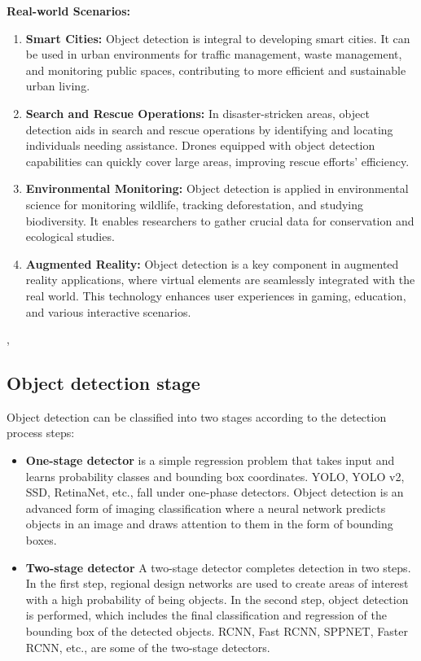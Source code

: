 \textbf{Real-world Scenarios:}\\
\begin{enumerate}
    \item \textbf{Smart Cities:} Object detection is integral to developing smart cities. It can be used in urban environments for traffic management, waste management, and monitoring public spaces, contributing to more efficient and sustainable urban living.
    \item \textbf{Search and Rescue Operations:} In disaster-stricken areas, object detection aids in search and rescue operations by identifying and locating individuals needing assistance. Drones equipped with object detection capabilities can quickly cover large areas, improving rescue efforts' efficiency.
    \item \textbf{Environmental Monitoring: } Object detection is applied in environmental science for monitoring wildlife, tracking deforestation, and studying biodiversity. It enables researchers to gather crucial data for conservation and ecological studies.
    \item \textbf{Augmented Reality:} Object detection is a key component in augmented reality applications, where virtual elements are seamlessly integrated with the real world. This technology enhances user experiences in gaming, education, and various interactive scenarios.
\end{enumerate} \cite{ansari2020building}, \cite{pathak2018application}

\subsection{Object detection stage}
Object detection can be classified into two stages according to the detection process steps:
\begin{itemize}
    \item \textbf{One-stage detector}  is a simple regression problem that takes input and learns probability classes and bounding box coordinates. YOLO, YOLO v2, SSD, RetinaNet, etc., fall under one-phase detectors. Object detection is an advanced form of imaging classification where a neural network predicts objects in an image and draws attention to them in the form of bounding boxes. \cite{oneStage}
    \item \textbf{Two-stage detector} A two-stage detector completes detection in two steps. In the first step, regional design networks are used to create areas of interest with a high probability of being objects. In the second step, object detection is performed, which includes the final classification and regression of the bounding box of the detected objects. RCNN, Fast RCNN, SPPNET, Faster RCNN, etc., are some of the two-stage detectors. \cite{du2020overview}
\end{itemize}

